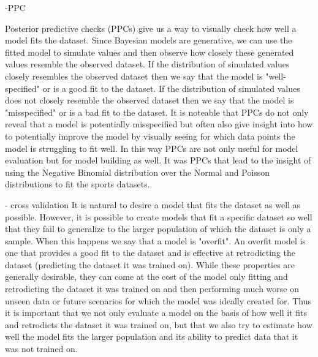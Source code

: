 -PPC

Posterior predictive checks (PPCs) give us a way to visually check how well a model fits the dataset. Since Bayesian models are generative, we can use the fitted model to simulate values and then observe how closely these generated values resemble the observed dataset. If the distribution of simulated values closely resembles the observed dataset then we say that the model is "well-specified" or is a good fit to the dataset. If the distribution of simulated values does not closely resemble the observed dataset then we say that the model is "misspecified" or is a bad fit to the dataset. It is noteable that PPCs do not only reveal that a model is potentially misspecified but often also give insight into how to potentially improve the model by visually seeing for which data points the model is struggling to fit well. In this way PPCs are not only useful for model evaluation but for model building as well. It was PPCs that lead to the insight of using the Negative Binomial distribution over the Normal and Poisson distributions to fit the sports datasets.

- cross validation
It is natural to desire a model that fits the dataset as well as possible. However, it is possible to create models that fit a specific dataset so well that they fail to generalize to the larger population of which the dataset is only a sample. When this happens we say that a model is "overfit". An overfit model is one that provides a good fit to the dataset and is effective at retrodicting the dataset (predicting the dataset it was trained on). While these properties are generally desirable, they can come at the cost of the model only fitting and retrodicting the dataset it was trained on and then performing much worse on unseen data or future scenarios for which the model was ideally created for. Thus it is important that we not only evaluate a model on the basis of how well it fits and retrodicts the dataset it was trained on, but that we also try to estimate how well the model fits the larger population and its ability to predict data that it was not trained on. 

